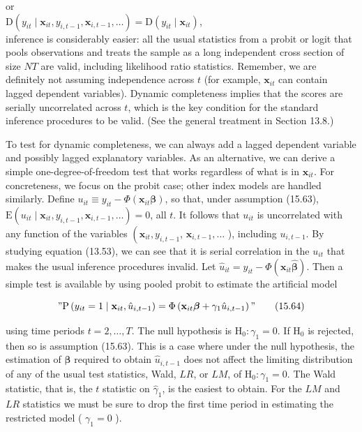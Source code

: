 \documentclass[10pt]{article}
\begin{document}
or\\
$\mathrm{D}\left(y_{i t} \mid \mathbf{x}_{i t}, y_{i, t-1}, \mathbf{x}_{i, t-1}, \ldots\right)=\mathrm{D}\left(y_{i t} \mid \mathbf{x}_{i t}\right)$,\\
inference is considerably easier: all the usual statistics from a probit or logit that pools observations and treats the sample as a long independent cross section of size $N T$ are valid, including likelihood ratio statistics. Remember, we are definitely not assuming independence across $t$ (for example, $\mathbf{x}_{i t}$ can contain lagged dependent variables). Dynamic completeness implies that the scores are serially uncorrelated across $t$, which is the key condition for the standard inference procedures to be valid. (See the general treatment in Section 13.8.)

To test for dynamic completeness, we can always add a lagged dependent variable and possibly lagged explanatory variables. As an alternative, we can derive a simple one-degree-of-freedom test that works regardless of what is in $\mathbf{x}_{i t}$. For concreteness, we focus on the probit case; other index models are handled similarly. Define $u_{i t} \equiv y_{i t}-\Phi\left(\mathbf{x}_{i t} \boldsymbol{\beta}\right)$, so that, under assumption (15.63), $\mathrm{E}\left(u_{i t} \mid \mathbf{x}_{i t}, y_{i, t-1}, \mathbf{x}_{i, t-1}, \ldots\right)=0$, all $t$. It follows that $u_{i t}$ is uncorrelated with any function of the variables $\left(\mathbf{x}_{i t}, y_{i, t-1}\right.$, $\mathbf{x}_{i, t-1}, \ldots$ ), including $u_{i, t-1}$. By studying equation (13.53), we can see that it is serial correlation in the $u_{i t}$ that makes the usual inference procedures invalid. Let $\hat{u}_{i t}= y_{i t}-\Phi\left(\mathbf{x}_{i t} \hat{\boldsymbol{\beta}}\right)$. Then a simple test is available by using pooled probit to estimate the artificial model


\begin{equation*}
" \mathrm{P}\left(y_{i t}=1 \mid \mathbf{x}_{i t}, \hat{u}_{i, t-1}\right)=\Phi\left(\mathbf{x}_{i t} \boldsymbol{\beta}+\gamma_{1} \hat{u}_{i, t-1}\right) " \tag{15.64}
\end{equation*}


using time periods $t=2, \ldots, T$. The null hypothesis is $\mathrm{H}_{0}: \gamma_{1}=0$. If $\mathrm{H}_{0}$ is rejected, then so is assumption (15.63). This is a case where under the null hypothesis, the estimation of $\boldsymbol{\beta}$ required to obtain $\hat{u}_{i, t-1}$ does not affect the limiting distribution of any of the usual test statistics, Wald, $L R$, or $L M$, of $\mathrm{H}_{0}: \gamma_{1}=0$. The Wald statistic, that is, the $t$ statistic on $\hat{\gamma}_{1}$, is the easiest to obtain. For the $L M$ and $L R$ statistics we must be sure to drop the first time period in estimating the restricted model ( $\gamma_{1}=0$ ).
\end{document}
